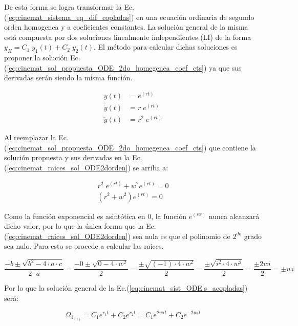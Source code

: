 \documentclass[oneside,a4paper,english,links]{amca}
\begin{document}
De esta forma se logra transformar la Ec.(\ref{eq:cinemat_sistema_eq_dif_copladas}) en una ecuaci\'on ordinaria de segundo orden homogenea y a coeficientes constantes. La soluci\'on general de la misma est\'a compuesta por dos soluciones linealmente independientes (LI) de la forma $y_H=C_1\;y_1(t)+C_2\;y_2(t)$. El m\'etodo para calcular dichas soluciones es proponer la soluci\'on Ec.(\ref{eq:cinemat_sol_propuesta_ODE_2do_homegenea_coef_cts}) ya que sus derivadas ser\'an siendo la misma funci\'on.

\begin{equation}
    \begin{split}
        y(t)&=e^{(rt)}\\
        \dot{y}(t)&= r\;e^{(rt)}\\
        \ddot{y}(t)&= r^2\;e^{(rt)}
    \end{split}
    \label{eq:cinemat_sol_propuesta_ODE_2do_homegenea_coef_cts}
\end{equation}

 Al reemplazar la Ec.(\ref{eq:cinemat_sol_propuesta_ODE_2do_homegenea_coef_cts}) que contiene la soluci\'on propuesta y sus derivadas en la Ec.(\ref{eq:cinemat_raices_sol_ODE2dorden}) se arriba a:

\begin{equation}
    \begin{split}
        r^2\;e^{(rt)}+w^2e^{(rt)}=0\\
        \left(r^2+w^2\right)e^{(rt)}=0
    \end{split}
    \label{eq:cinemat_raices_sol_ODE2dorden}
\end{equation}

Como la funci\'on exponencial es asint\'otica en 0, la funci\'on $e^{(rx)}$ nunca alcanzar\'a dicho valor, por lo que la \'unica forma que la Ec.(\ref{eq:cinemat_raices_sol_ODE2dorden}) sea nula es que el polinomio de $2^{do}$ grado sea nulo. Para esto se procede a calcular las raices.

\begin{equation}
    \frac{-b\pm \sqrt{b^2-4\cdot a \cdot c}}{2\cdot a}=    \frac{-0\pm \sqrt{0-4\cdot w^2}}{2}=\frac{\pm \sqrt{(-1)\cdot4\cdot w^2}}{2}=\frac{\pm \sqrt{i^2\cdot4\cdot w^2}}{2}=\frac{\pm 2wi}{2}=\pm wi
    \label{eq:cinemat_raiz_resolvente}
\end{equation}

Por lo que la soluci\'on general de la Ec.(\ref{eq:cinemat_sist_ODE's_acopladas}) ser\'a:

\begin{equation}
  \Omega_{1_{(t)}}=C_1 e^{r_1t}+C_2 e^{r_2t}=C_1 e^{2wit}+C_2 e^{-2wit}  
    \label{eq:cinemat_eq_general_omega1}
\end{equation}
  
\end{document}
